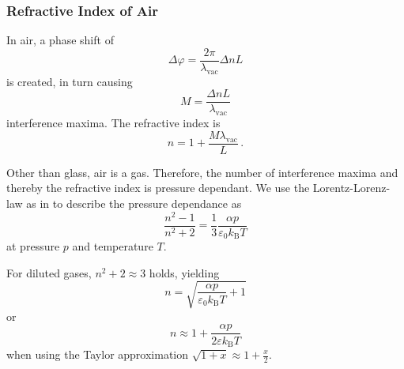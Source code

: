 \subsubsection{Refractive Index of Air}

In air, a phase shift of
\begin{equation*}
    \Delta \varphi = \frac{2 \pi}{\lambda_\text{vac}} \Delta n L 
\end{equation*}
is created, in turn causing
\begin{equation*}
    M = \frac{\Delta n L}{\lambda_\text{vac}}
\end{equation*}
interference maxima.
The refractive index is
\begin{equation*}
    n = 1 + \frac{M \lambda_\text{vac}}{L} \,.
\end{equation*}

Other than glass, air is a gas. 
Therefore, the number of interference maxima and thereby the refractive index is pressure dependant.
We use the Lorentz-Lorenz-law as in \cite{lololaw} to describe the pressure dependance as
\begin{equation*}
    \frac{n^2 - 1}{n^2 + 2} = \frac{1}{3} \frac{\alpha p}{\varepsilon_0 k_\text{B} T}
\end{equation*}
at pressure $p$ and temperature $T$.

For diluted gases, $n^2 + 2 \approx 3$ holds, yielding
\begin{equation*}
    n = \sqrt{\frac{\alpha p}{\varepsilon_0 k_\text{B} T} + 1}
\end{equation*}
or
\begin{equation}
    n \approx 1 + \frac{\alpha p}{2 \varepsilon k_\text{B} T}
    \label{eq:refractiveindexair}
\end{equation}
when using the Taylor approximation $\sqrt{1 + x} \approx 1 + \frac{x}{2}$.




